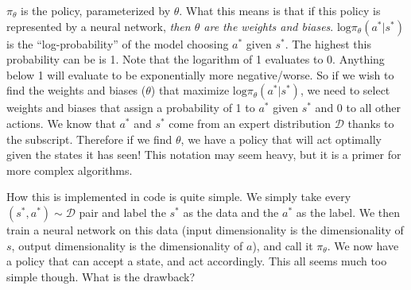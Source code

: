 \begin{flushleft}
   $\pi_\theta$ is the policy, parameterized by $\theta$. What this means is that if this policy is represented by a neural network, \textit{then $\theta$ are the weights and biases}. $\mathrm{log}\pi_\theta(a^{*}|s^{*})$ is the ``log-probability'' of the model choosing $a^{*}$ given $s^{*}$. The highest this probability can be is 1. Note that the logarithm of 1 evaluates to 0. Anything below 1 will evaluate to be exponentially more negative/worse. So if we wish to find the weights and biases ($\theta$) that maximize $\mathrm{log}\pi_\theta(a^{*}|s^{*})$, we need to select weights and biases that assign a probability of 1 to $a^{*}$ given $s^{*}$ and 0 to all other actions. We know that $a^{*}$ and $s^{*}$ come from an expert distribution $\mathcal{D}$ thanks to the subscript. Therefore if we find $\theta$, we have a policy that will act optimally given the states it has seen! This notation may seem heavy, but it is a primer for more complex algorithms. \break

   How this is implemented in code is quite simple. We simply take every $(s^{*},a^{*}) \sim \mathcal{D}$ pair and label the $s^{*}$ as the data and the $a^{*}$ as the label. We then train a neural network on this data (input dimensionality is the dimensionality of $s$, output dimensionality is the dimensionality of $a$), and call it $\pi_\theta$. We now have a policy that can accept a state, and act accordingly. This all seems much too simple though. What is the drawback?
\end{flushleft}

